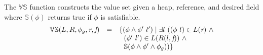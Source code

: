 \begin{definition}
\label{def:VS}
The $\mathbb{VS}$ function constructs the value set given a
heap, reference, and desired field where $\mathbb{S}(\phi)$ returns true if $\phi$ is satisfiable.
\[
\begin{array}{rcl}
  \mathbb{VS}(L,R,\phi_g,\emph{r},\emph{f}) & = &
  \{(\phi\wedge\phi^\prime\ l^\prime) \mid \exists
  l\ ((\phi\ l) \in L(\emph{r})\ \wedge \\ & &
  \ \ (\phi^\prime\ l^\prime) \in L(R(l,\emph{f}))\ \wedge \\ & &
  \ \ \mathbb{S}(\phi\wedge\phi^\prime\wedge \phi_g))\}
\end{array}
\]
\end{definition}
